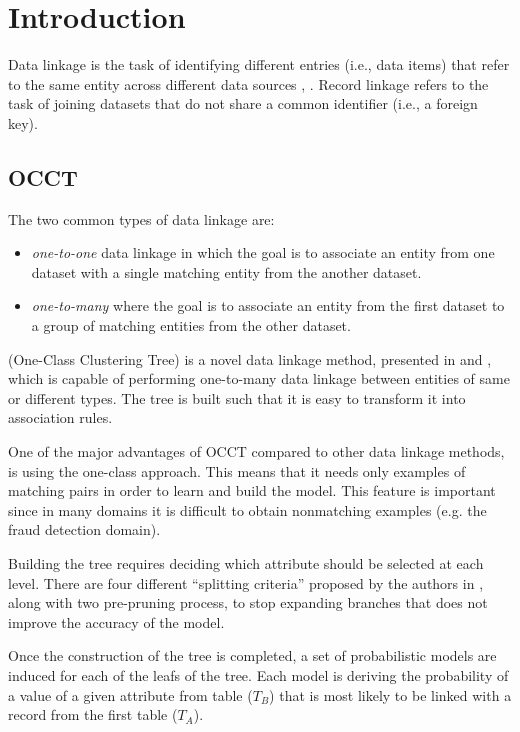 \documentclass[a4paper,12pt]{article}
\newcommand{\newpar}{\smallskip\noindent} %
\begin{document}
\section{Introduction}
\begin{spacing}{1.5}
Data linkage is the task of identifying different entries (i.e., data items) that refer to the same
entity across different data sources \cite{damaging2011}, \cite{kamra2008detecting}. Record linkage refers to the task of joining datasets
that do not share a common identifier (i.e., a foreign key).

\subsection{OCCT}
The two common types of data linkage are:
\begin{itemize}
  \item \emph{one-to-one} data linkage in which the goal is to associate
an entity from one dataset with a single matching entity from the another dataset.
  \item \emph{one-to-many} where the goal is to associate an entity from the first
   dataset to a group of matching entities from the other dataset.
\end{itemize}
\newpar{OCCT} (One-Class Clustering Tree) is a novel data linkage method, presented in \cite{dror2011thesis} and \cite{dror2014occt},
which is capable of performing one-to-many data linkage between entities of same or different
types. The tree is built such that it is easy to transform it into association rules.

One of the major advantages of OCCT compared to other data linkage methods, is using the
one-class approach. This means that it needs only examples of matching pairs in order to learn
and build the model. This feature is important since in many domains it is difficult to obtain
nonmatching examples (e.g. the fraud detection domain).

Building the tree requires deciding which attribute should be selected at each level. There are
four different “splitting criteria” proposed by the authors in \cite{dror2014occt}, along with two pre-pruning process,
to stop expanding branches that does not improve the accuracy of the model.

Once the construction of the tree is completed, a set of probabilistic models are induced for each
of the leafs of the tree.
Each model is deriving the probability of a value of a given attribute from table ($T_{B}$) that
is most likely to be linked with a record from the first table ($T_{A}$).


\end{spacing}
\end{document}
